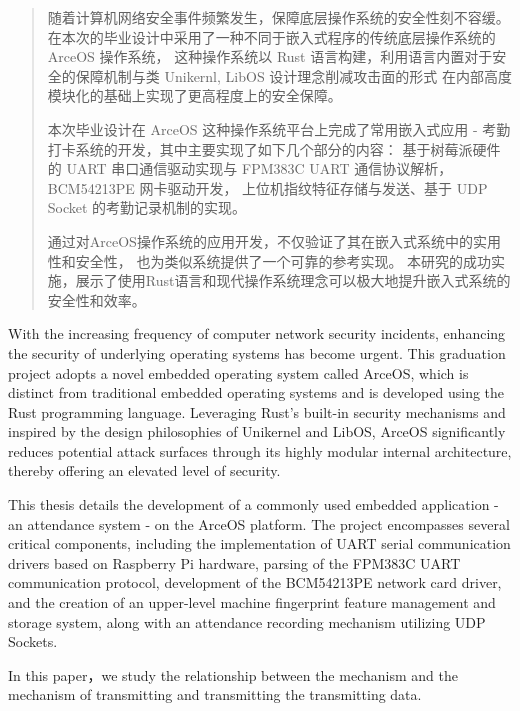 \documentclass[UTF8,AutoFakeBold=1,AutoFakeSlant,zihao=-4]{scnuthesis}
\begin{document}
\coverpage

\newpage
\begin{abstract}
随着计算机网络安全事件频繁发生，保障底层操作系统的安全性刻不容缓。
在本次的毕业设计中采用了一种不同于嵌入式程序的传统底层操作系统的 ArceOS 操作系统，
这种操作系统以 Rust 语言构建，利用语言内置对于安全的保障机制与类 Unikernl, LibOS 设计理念削减攻击面的形式
在内部高度模块化的基础上实现了更高程度上的安全保障。

本次毕业设计在 ArceOS 这种操作系统平台上完成了常用嵌入式应用 - 考勤打卡系统的开发，其中主要实现了如下几个部分的内容：
基于树莓派硬件的 UART 串口通信驱动实现与 FPM383C UART 通信协议解析，BCM54213PE 网卡驱动开发，
上位机指纹特征存储与发送、基于 UDP Socket 的考勤记录机制的实现。

通过对ArceOS操作系统的应用开发，不仅验证了其在嵌入式系统中的实用性和安全性，
也为类似系统提供了一个可靠的参考实现。
本研究的成功实施，展示了使用Rust语言和现代操作系统理念可以极大地提升嵌入式系统的安全性和效率。
\end{abstract}

\begin{abstractEN}
    With the increasing frequency of computer network security incidents, 
    enhancing the security of underlying operating systems has become urgent. 
    This graduation project adopts a novel embedded operating system called ArceOS, 
    which is distinct from traditional embedded operating systems 
    and is developed using the Rust programming language. 
    Leveraging Rust's built-in security mechanisms and 
    inspired by the design philosophies of Unikernel and LibOS, ArceOS significantly reduces potential 
    attack surfaces through its highly modular internal architecture, 
    thereby offering an elevated level of security.

    This thesis details the development of a commonly used embedded application - an attendance system - on the ArceOS platform. The project encompasses several critical components, including the implementation of UART serial communication drivers based on Raspberry Pi hardware, parsing of the FPM383C UART communication protocol, development of the BCM54213PE network card driver, and the creation of an upper-level machine fingerprint feature management and storage system, along with an attendance recording mechanism utilizing UDP Sockets.

    In this paper，we study the relationship between the mechanism and the mechanism of transmitting and transmitting the transmitting data.
\end{abstractEN}
\end{document}
